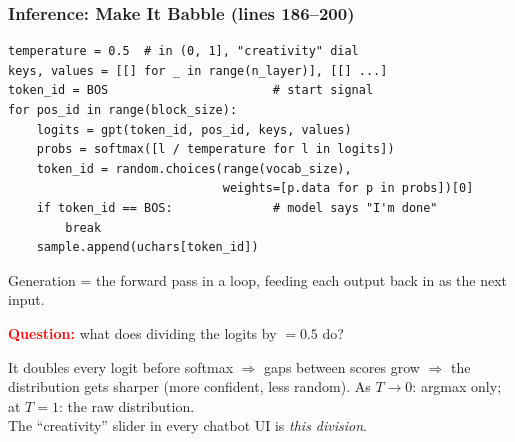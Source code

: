 \begin{frame}[fragile]
    \frametitle{Inference: Make It Babble (lines 186--200)}

\begin{lstlisting}
temperature = 0.5  # in (0, 1], "creativity" dial
keys, values = [[] for _ in range(n_layer)], [[] ...]
token_id = BOS                       # start signal
for pos_id in range(block_size):
    logits = gpt(token_id, pos_id, keys, values)
    probs = softmax([l / temperature for l in logits])
    token_id = random.choices(range(vocab_size),
                              weights=[p.data for p in probs])[0]
    if token_id == BOS:              # model says "I'm done"
        break
    sample.append(uchars[token_id])
\end{lstlisting}

    Generation = the forward pass in a loop, \alert{feeding each output back in as the next input}.

    \pause

    \textcolor{red}{\textbf{Question:}} what does dividing the logits by  $= 0.5$ do?

    \pause

    It \alert{doubles} every logit before softmax $\Rightarrow$ gaps between scores grow $\Rightarrow$ the distribution gets \alert{sharper} (more confident, less random). As $T \to 0$: argmax only; at $T = 1$: the raw distribution.\\
    The ``creativity'' slider in every chatbot UI is \emph{this division}.
\end{frame}

